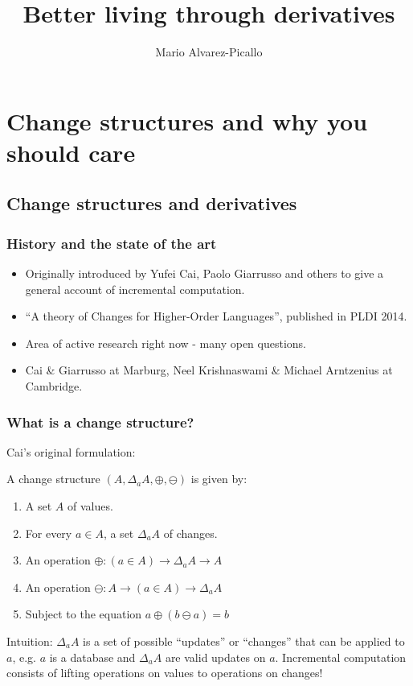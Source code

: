 \documentclass[english]{beamer}
\title{Better living through derivatives}
\author{Mario Alvarez-Picallo}
\theoremstyle{plain}
\theoremstyle{remark}
\theoremstyle{remark}
\theoremstyle{remark}
\theoremstyle{definition}
\theoremstyle{definition}
\newcommand{\ra}[0]{\rightarrow}
\begin{document}
\frame\titlepage

\section{Change structures and why you should care}

\subsection{Change structures and derivatives}

\begin{frame}
  \frametitle{History and the state of the art}
  \begin{itemize}

  \item Originally introduced by Yufei Cai, Paolo Giarrusso and others to give a general
    account of incremental computation.
    \vfill
  \item ``A theory of Changes for Higher-Order Languages'', published in PLDI 2014.
    \vfill
  \item Area of active research right now - many open questions.
    \vfill
  \item Cai \& Giarrusso at Marburg, Neel Krishnaswami \& Michael Arntzenius at Cambridge.
  \end{itemize}
\end{frame}

\begin{frame}
  \frametitle{What is a change structure?}
  Cai's original formulation:
  \begin{definition}
    A change structure $(A, \Delta_a A, \oplus, \ominus)$ is given by:
    \begin{enumerate}
    \item A set $A$ of values.
    \item For every $a \in A$, a set $\Delta_a A$ of changes.
    \item An operation $\oplus : (a \in A) \ra \Delta_a A \ra A$
    \item An operation $\ominus : A \ra (a \in A) \ra \Delta_a A$
    \item Subject to the equation $a \oplus (b \ominus a) = b$
    \end{enumerate}
  \end{definition}
  \vfill
  Intuition: $\Delta_a A$ is a set of possible ``updates'' or ``changes'' that can be applied
  to $a$, e.g. $a$ is a database and $\Delta_a A$ are valid updates on $a$.
  \vfill
  Incremental computation consists of lifting operations on values to operations on changes!
\end{frame}
\end{document}
